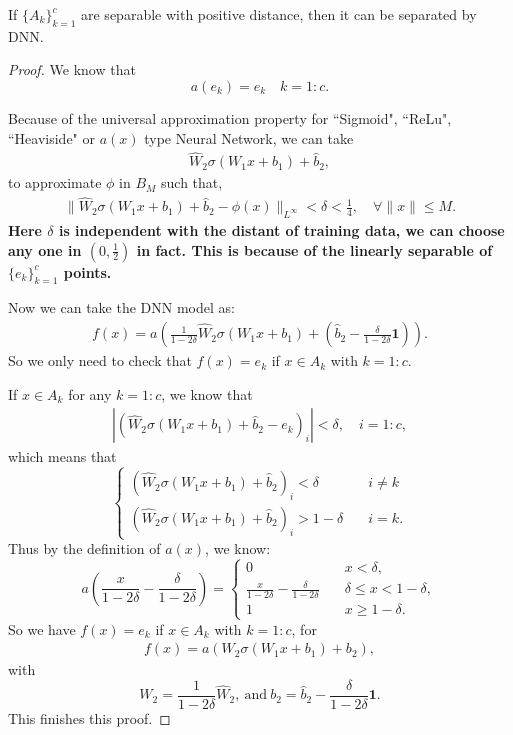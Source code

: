 \begin{theorem}
If $\{A_k\}_{k=1}^c$ are separable with positive distance, then it can be separated by DNN.
\end{theorem}
\begin{proof}
We know that 
\begin{equation}
a(e_k) = e_k \quad k = 1:c.
\end{equation}

Because of the universal approximation property for ``Sigmoid", ``ReLu", ``Heaviside" or $a(x)$ type Neural Network, we can take 
\begin{align}
\hat{W}_2\sigma(W_1 x + b_1) + \hat{b}_2,
\end{align}
to approximate $\phi$ in $B_M$ such that,
\begin{align}
\|\hat{W}_2\sigma(W_1 x + b_1) + \hat{b}_2 - \phi(x) \|_{L^{\infty}} < \delta < \frac{1}{4}, \quad \forall \|x\| \le M.
\end{align}
{\bf Here $\delta$ is independent with the distant of training data, we can choose any one in $(0, \frac{1}{2})$ in fact. 
This is because of the linearly separable of $\{e_k\}_{k=1}^c$ points.
}

Now we can take the DNN model as:
\begin{align}
f(x) = a(\frac{1}{1-2\delta}\hat{W}_2\sigma(W_1 x + b_1) + (\hat{b}_2 -\frac{\delta}{1-2\delta}\bm{1})).
\end{align}
So we only need to check that $f(x) = e_k$ if $x\in A_k$ with $k=1:c$. 

If $x \in A_k$ for any $k=1:c$, we know that 
\begin{align}
|(\hat{W}_2\sigma(W_1 x + b_1) + \hat{b}_2 - e_k)_i| < \delta, \quad  i = 1:c,
\end{align}
which means that
\begin{equation}
\begin{cases}
(\hat{W}_2\sigma(W_1 x + b_1) + \hat{b}_2 )_i < \delta \quad &i\neq k \\
(\hat{W}_2\sigma(W_1 x + b_1) + \hat{b}_2 )_i  > 1- \delta \quad &i = k.
\end{cases}
\end{equation}
Thus by the definition of $a(x)$, we know:
\begin{equation}
a(\frac{x}{1-2\delta} - \frac{\delta}{1-2\delta}) = \begin{cases}
0 \quad & x < \delta, \\
\frac{x}{1-2\delta} - \frac{\delta}{1-2\delta} \quad & \delta \le x < 1 - \delta, \\
1 \quad & x \ge 1 - \delta.
\end{cases}
\end{equation}
So we have 
$f(x) = e_k$ if $x\in A_k$ with $k=1:c$, for 
\begin{align}
f(x) = a(W_2\sigma(W_1 x + b_1) + b_2),
\end{align}
with 
\begin{equation}
W_2 = \frac{1}{1-2\delta}\hat{W}_2, ~ \text{and} ~ b_2 = \hat{b}_2 -\frac{\delta}{1-2\delta}\bm{1}.
\end{equation}
This finishes this proof.
\end{proof}

